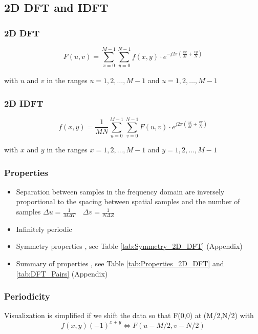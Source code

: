   

\subsection{2D DFT and IDFT }

\subsubsection{2D DFT}
\begin{equation}
    F(u,v) = \sum_{x=0}^{M-1}\sum_{y=0}^{N-1}f(x,y)\cdot e^{-j2\pi \left(\frac{ux}{M}+ \frac{vy}{N}\right)}
\end{equation}
\begin{center}
  with $u$ and $v$ in the ranges $u = 1,2,\ldots,M-1$ and $u = 1,2,\ldots,M-1$
\end{center}
\subsubsection{2D IDFT}
\begin{equation}
    f(x,y) = \frac{1}{MN} \sum_{u=0}^{M-1}\sum_{v=0}^{N-1}F(u,v)\cdot e^{j2\pi \left(\frac{ux}{M}+ \frac{vy}{N}\right)}
\end{equation}
\begin{center}
  with $x$ and $y$ in the ranges $x = 1,2,\ldots,M-1$ and $y = 1,2,\ldots,M-1$
\end{center}

\subsubsection{Properties}
\begin{itemize}
\item Separation between samples in the frequency domain are inversely proportional to the spacing between spatial samples and the number of samples
$\Delta u = \frac{1}{M \Delta T} \quad \Delta v = \frac{1}{N \Delta Z}$
\item Infinitely periodic
\item Symmetry properties , see Table \ref{tab:Symmetry_2D_DFT} (Appendix)
\item Summary of properties , see Table \ref{tab:Properties_2D_DFT} and \ref{tab:DFT_Pairs} (Appendix)

\end{itemize}

\subsubsection{Periodicity }
  Visualization is simplified if we shift the data so that F(0,0) at (M/2,N/2) with
    \begin{equation}
      f(x,y)(-1)^{x+y} \Leftrightarrow F(u-M/2, v-N/2)
    \end{equation}
    
